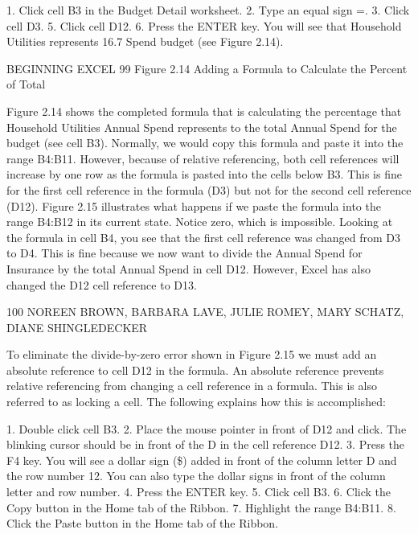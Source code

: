 1.   Click cell B3 in the Budget Detail worksheet.
2.   Type an equal sign =.
3.   Click cell D3.
5.   Click cell D12.
6.   Press the ENTER key. You will see that Household Utilities represents 16.7%
Spend budget (see Figure 2.14).




BEGINNING EXCEL 99
Figure 2.14 Adding a Formula to Calculate the Percent of Total


Figure 2.14 shows the completed formula that is calculating the percentage that Household Utilities
Annual Spend represents to the total Annual Spend for the budget (see cell B3). Normally, we would
copy this formula and paste it into the range B4:B11. However, because of relative referencing, both
cell references will increase by one row as the formula is pasted into the cells below B3. This is fine
for the first cell reference in the formula (D3) but not for the second cell reference (D12). Figure 2.15
illustrates what happens if we paste the formula into the range B4:B12 in its current state. Notice
zero, which is impossible. Looking at the formula in cell B4, you see that the first cell reference was
changed from D3 to D4. This is fine because we now want to divide the Annual Spend for Insurance
by the total Annual Spend in cell D12. However, Excel has also changed the D12 cell reference to D13.




100 NOREEN BROWN, BARBARA LAVE, JULIE ROMEY, MARY SCHATZ, DIANE SHINGLEDECKER


To eliminate the divide-by-zero error shown in Figure 2.15 we must add an absolute reference to
cell D12 in the formula. An absolute reference prevents relative referencing from changing a cell
reference in a formula. This is also referred to as locking a cell. The following explains how this is
accomplished:

1. Double click cell B3.
2. Place the mouse pointer in front of D12 and click. The blinking cursor should be in front of the
D in the cell reference D12.
3. Press the F4 key. You will see a dollar sign (\$) added in front of the column letter D and the row
number 12. You can also type the dollar signs in front of the column letter and row number.
4. Press the ENTER key.
5. Click cell B3.
6. Click the Copy button in the Home tab of the Ribbon.
7. Highlight the range B4:B11.
8. Click the Paste button in the Home tab of the Ribbon.

